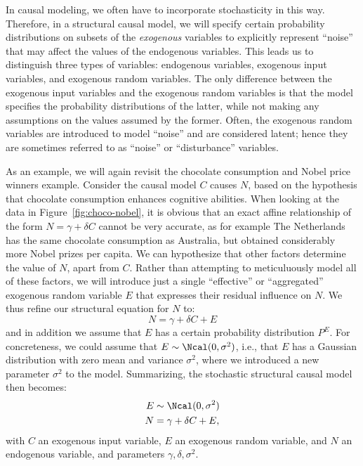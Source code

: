 In causal modeling, we often have to 
incorporate stochasticity in this way. Therefore, in a structural causal model,
we will specify certain probability distributions on subsets of the \emph{exogenous}
variables to explicitly represent ``noise'' that may affect the values of the
endogenous variables. This leads us to distinguish three types of variables:
endogenous variables, exogenous input variables, and exogenous random variables.
The only difference between the exogenous input variables and the exogenous
random variables is that the model specifies the probability distributions of the
latter, while not making any assumptions on the values assumed by the former.
Often, the exogenous random variables are introduced to model ``noise'' and 
are considered latent; hence they are sometimes referred to as ``noise'' or
``disturbance'' variables.

As an example, we will again revisit the chocolate consumption and Nobel price
winners example. Consider the causal model $C$ causes $N$, based on the hypothesis
that chocolate consumption enhances cognitive abilities. When looking at the data
in Figure~\ref{fig:choco-nobel}, it is obvious that an exact affine relationship
of the form $N = \gamma + \delta C$ cannot be very accurate, as for example
The Netherlands has the same chocolate consumption as Australia, but obtained 
considerably more Nobel prizes per capita. We can hypothesize that 
other factors determine the value of $N$, apart from $C$. Rather than attempting to meticuluously
model all of these factors, we will introduce just a single ``effective'' or 
``aggregated'' exogenous random
variable $E$ that expresses their residual influence on $N$. We thus refine our
structural equation for $N$ to:
  \begin{equation}\label{eq:se_C_causes_N_noisy}
  N = \gamma + \delta C + E
  \end{equation}
and in addition we assume that $E$ has a certain probability distribution $P^E$.
For concreteness, we could assume that $E \sim \Ncal(0,\sigma^2)$, i.e., that $E$
has a Gaussian distribution with zero mean and variance $\sigma^2$, where we 
introduced a new parameter $\sigma^2$ to the model. Summarizing, the stochastic
structural causal model then becomes:
  \begin{align*}\label{eq:scm_C_causes_N_noisy}
      E \sim {} & \Ncal(0,\sigma^2) \\
      N = {} & \gamma + \delta C + E,
  \end{align*}
with $C$ an exogenous input variable, $E$ an exogenous random variable,
and $N$ an endogenous variable, and parameters $\gamma,\delta,\sigma^2$.


